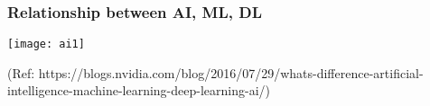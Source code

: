 %
%
%
%
%
%
%

\begin{frame}[fragile]\frametitle{Relationship between AI, ML, DL}
\begin{center}
\texttt{[image: ai1]}
\end{center}
{\tiny (Ref: https://blogs.nvidia.com/blog/2016/07/29/whats-difference-artificial-intelligence-machine-learning-deep-learning-ai/)}
\end{frame}

